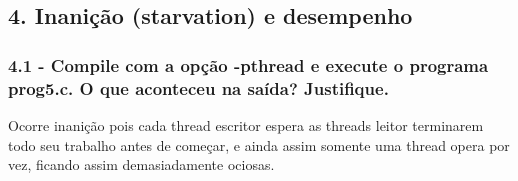\subsection*{4. Inanição (starvation) e desempenho}

\subsubsection{4.1 - Compile com a opção -pthread e execute o programa prog5.c. O que aconteceu na saída? Justiﬁque.}

Ocorre inanição pois cada thread escritor espera as threads leitor terminarem todo seu trabalho antes de começar, e ainda assim somente uma thread opera por vez, ficando assim demasiadamente ociosas.

